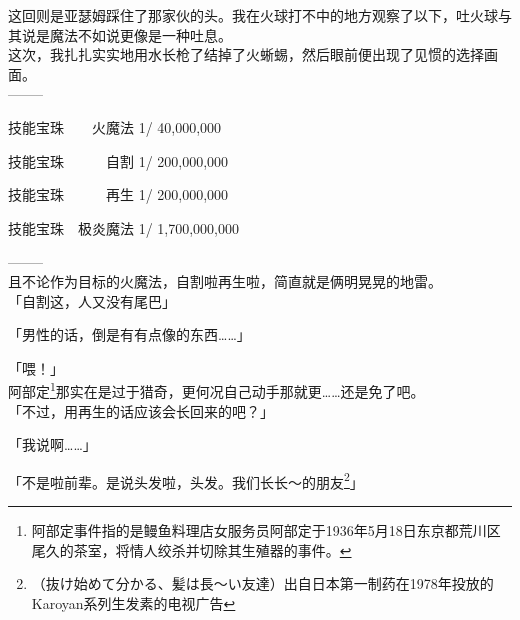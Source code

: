 这回则是亚瑟姆踩住了那家伙的头。我在火球打不中的地方观察了以下，吐火球与其说是魔法不如说更像是一种吐息。\\

这次，我扎扎实实地用水长枪了结掉了火蜥蜴，然后眼前便出现了见惯的选择画面。\\

  --------

  技能宝珠　　火魔法 1/    40,000,000

  技能宝珠　　　自割 1/   200,000,000

  技能宝珠　　　再生 1/   200,000,000

  技能宝珠　极炎魔法 1/ 1,700,000,000

  --------\\

且不论作为目标的火魔法，自割啦再生啦，简直就是俩明晃晃的地雷。\\

「自割这，人又没有尾巴」

「男性的话，倒是有有点像的东西……」

「喂！」\\

阿部定\footnote{阿部定事件指的是鳗鱼料理店女服务员阿部定于1936年5月18日东京都荒川区尾久的茶室，将情人绞杀并切除其生殖器的事件。}那实在是过于猎奇，更何况自己动手那就更……还是免了吧。\\

「不过，用再生的话应该会长回来的吧？」

「我说啊……」

「不是啦前辈。是说头发啦，头发。我们长长～的朋友\footnote{（抜け始めて分かる、髪は長～い友達）出自日本第一制药在1978年投放的Karoyan系列生发素的电视广告}」

